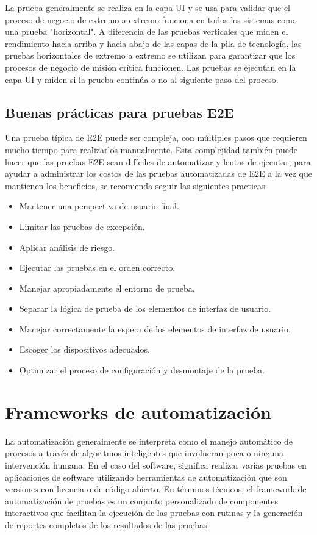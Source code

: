 La prueba generalmente se realiza en la capa UI y se usa para validar que el
proceso de negocio de extremo a extremo funciona en todos los sistemas como una
prueba "horizontal". A diferencia de las pruebas verticales que miden el
rendimiento hacia arriba y hacia abajo de las capas de la pila de tecnología,
las pruebas horizontales de extremo a extremo se utilizan para garantizar que
los procesos de negocio de misión crítica funcionen. Las pruebas se ejecutan en
la capa UI y miden si la prueba continúa o no al siguiente paso del proceso.

\subsection{Buenas prácticas para pruebas E2E}
Una prueba típica de E2E puede ser compleja, con múltiples pasos que requieren
mucho tiempo para realizarlos manualmente. Esta complejidad también puede hacer
que las pruebas E2E sean difíciles de automatizar y lentas de ejecutar, para
ayudar a administrar los costos de las pruebas automatizadas de E2E a la vez que
mantienen los beneficios, se recomienda seguir las siguientes practicas:

\begin{itemize}
    \item Mantener una perspectiva de usuario final.
    \item Limitar las pruebas de excepción.
    \item Aplicar análisis de riesgo.
    \item Ejecutar las pruebas en el orden correcto.
    \item Manejar apropiadamente el entorno de prueba.
    \item Separar la lógica de prueba de los elementos de interfaz de usuario.
    \item Manejar correctamente la espera de los elementos de interfaz de usuario.
    \item Escoger los dispositivos adecuados.
    \item Optimizar el proceso de configuración y desmontaje de la prueba.
\end{itemize}

\section{Frameworks de automatización}
La automatización generalmente se interpreta como el manejo automático de
procesos a través de algoritmos inteligentes que involucran poca o ninguna
intervención humana. En el caso del software, significa realizar varias pruebas
en aplicaciones de software utilizando herramientas de automatización que son
versiones con licencia o de código abierto. En términos técnicos, el framework
de automatización de pruebas es un conjunto personalizado de componentes
interactivos que facilitan la ejecución de las pruebas con rutinas y la
generación de reportes completos de los resultados de las pruebas.

